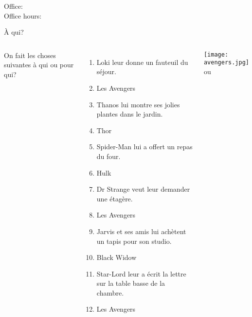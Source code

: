 \documentclass{beamer}
\subtitle[Meubles et objets indirects]{Les meubles et les pronoms compléments d'objet indirect}
\begin{document}
  \begin{frame}
    \titlepage
    \tiny{Office: \\
          Office hours: }
  \end{frame}

  \begin{frame}{À qui?}
    \begin{columns}
        \scriptsize
        On fait les choses suivantes à qui ou pour qui?
        \begin{enumerate}
          \item Loki leur donne un fauteuil du séjour.
          \item<2->[$\to$] Les Avengers
          \item<3-> Thanos lui montre ses jolies plantes dans le jardin.
          \item<4->[$\to$] Thor
          \item<5-> Spider-Man lui a offert un repas du four.
          \item<6->[$\to$] Hulk
          \item<7-> Dr Strange veut leur demander une étagère.
          \item<8->[$\to$] Les Avengers
          \item<9-> Jarvis et ses amis lui achètent un tapis pour son studio.
          \item<10->[$\to$] Black Widow
          \item<11-> Star-Lord leur a écrit la lettre sur la table basse de la chambre.
          \item<12->[$\to$] Les Avengers
        \end{enumerate}
        \begin{minipage}[t][0.6\textheight]{\linewidth}
          \begin{center}
            \texttt{[image: avengers.jpg]} \\
            ou \\
            \vspace{8pt}
          \end{center}
        \end{minipage}
    \end{columns}
  \end{frame}
\end{document}
